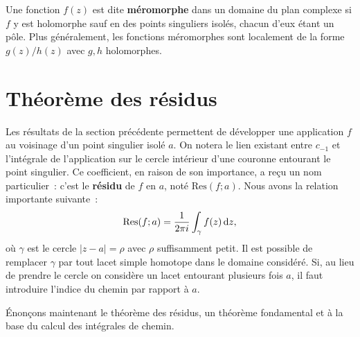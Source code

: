 Une fonction $f(z)$ est dite \textbf{méromorphe} dans un domaine du plan complexe si $f$ y est holomorphe sauf en des points singuliers isolés, chacun d'eux étant un pôle. Plus généralement, les fonctions méromorphes sont localement de la forme $g(z)/h(z)$ avec $g,h$ holomorphes.


\section{Théorème des résidus}
Les résultats de la section précédente permettent de développer une application
$f$ au voisinage d'un point singulier isolé $a$. On notera le lien existant
entre $c_{-1}$ et l'intégrale de l'application sur le cercle intérieur d'une couronne
entourant le point singulier. Ce coefficient, en raison de son importance,
a reçu un nom particulier~: c'est le \textbf{résidu} de $f$ en $a$, noté $\text{Res}(f;a)$. Nous avons la relation importante suivante~:
\[\text{Res}(f;a) = \frac{1}{2 \pi i} \int_\gamma f(z) \mathop{}\mathopen{}\mathrm{d} z,\]
où $\gamma$ est le cercle $\lvert z-a\rvert =\rho$ avec $\rho$ suffisamment petit. Il est possible de remplacer $\gamma$ par tout lacet simple homotope dans le domaine considéré. Si, au lieu de prendre le cercle on considère un lacet entourant plusieurs fois $a$, il faut introduire l'indice du chemin par rapport à $a$.  


Énonçons maintenant le théorème des résidus, un théorème fondamental et à la base du calcul des intégrales de chemin.  

